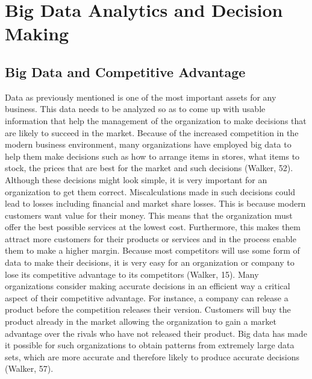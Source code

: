 \documentclass[sigconf]{acmart}
\begin{document}
\section{Big Data Analytics and Decision Making}
\subsection{Big Data and Competitive Advantage}
Data as previously mentioned is one of the most important assets for any business. This data needs to be analyzed so as to come up with usable information that help the management of the organization to make decisions that are likely to succeed in the market. Because of the increased competition in the modern business environment, many organizations have employed big data to help them make decisions such as how to arrange items in stores, what items to stock, the prices that are best for the market and such decisions (Walker, 52). Although these decisions might look simple, it is very important for an organization to get them correct. Miscalculations made in such decisions could lead to losses including financial and market share losses. This is because modern customers want value for their money. This means that the organization must offer the best possible services at the lowest cost. 
Furthermore, this makes them attract more customers for their products or services and in the process enable them to make a higher margin. Because most competitors will use some form of data to make their decisions, it is very easy for an organization or company to lose its competitive advantage to its competitors (Walker, 15). Many organizations consider making accurate decisions in an efficient way a critical aspect of their competitive advantage. For instance, a company can release a product before the competition releases their version. Customers will buy the product already in the market allowing the organization to gain a market advantage over the rivals who have not released their product. Big data has made it possible for such organizations to obtain patterns from extremely large data sets, which are more accurate and therefore likely to produce accurate decisions (Walker, 57).
\end{document}
